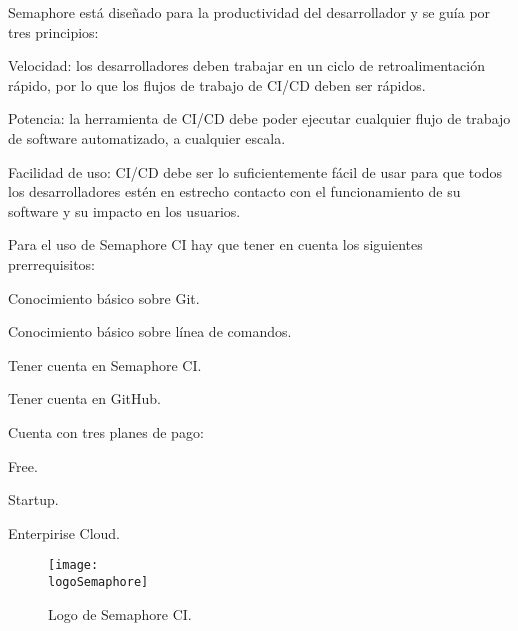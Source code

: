 Semaphore está diseñado para la productividad del desarrollador y se guía por tres principios:
\begin{compactitem}
    \item Velocidad: los desarrolladores deben trabajar en un ciclo de retroalimentación rápido, por lo que los flujos de trabajo de CI/CD deben ser rápidos.
    \item Potencia: la herramienta de CI/CD debe poder ejecutar cualquier flujo de trabajo de software automatizado, a cualquier escala.
    \item Facilidad de uso: CI/CD debe ser lo suficientemente fácil de usar para que todos los desarrolladores estén en estrecho contacto con el funcionamiento de su software y su impacto en los usuarios.
\end{compactitem}

Para el uso de Semaphore CI hay que tener en cuenta los siguientes prerrequisitos:
\begin{compactitem}
    \item Conocimiento básico sobre Git.
    \item Conocimiento básico sobre línea de comandos.
    \item Tener cuenta en Semaphore CI.
    \item Tener cuenta en GitHub.
\end{compactitem}

Cuenta con tres planes de pago:
\begin{compactitem}
    \item Free.
    \item Startup.
    \item Enterpirise Cloud.
\end{compactitem}

\begin{figure}[h]
    \centering
    \texttt{[image: \\logoSemaphore]}
    \caption{Logo de Semaphore CI.}
\end{figure}

